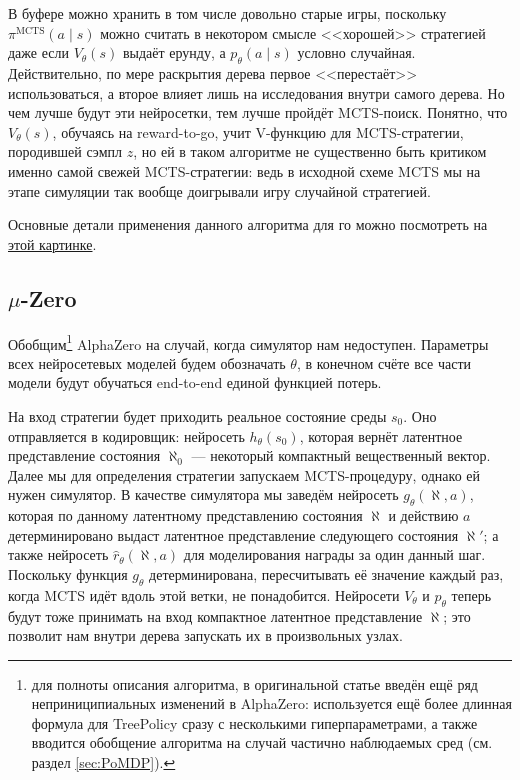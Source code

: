 В буфере можно хранить в том числе довольно старые игры, поскольку $\pi^{\mathrm{MCTS}}(a \mid s)$ можно считать в некотором смысле <<хорошей>> стратегией даже если $V_\theta(s)$ выдаёт ерунду, а $p_{\theta}(a \mid s)$ условно случайная. Действительно, по мере раскрытия дерева первое <<перестаёт>> использоваться, а второе влияет лишь на исследования внутри самого дерева. Но чем лучше будут эти нейросетки, тем лучше пройдёт MCTS-поиск. Понятно, что $V_{\theta}(s)$, обучаясь на reward-to-go, учит V-функцию для MCTS-стратегии, породившей сэмпл $z$, но ей в таком алгоритме не существенно быть критиком именно самой свежей MCTS-стратегии: ведь в исходной схеме MCTS мы на этапе симуляции так вообще доигрывали игру случайной стратегией.

\begin{example}
Основные детали применения данного алгоритма для го можно посмотреть на \href{https://miro.medium.com/max/2000/1*0pn33bETjYOimWjlqDLLNw.png}{этой картинке}.
\end{example}

\subsection{$\mu$-Zero}

Обобщим\footnote{для полноты описания алгоритма, в оригинальной статье введён ещё ряд неприниципиальных изменений в AlphaZero: используется ещё более длинная формула для TreePolicy сразу с несколькими гиперпараметрами, а также вводится обобщение алгоритма на случай частично наблюдаемых сред (см. раздел \ref{sec:PoMDP}).} AlphaZero на случай, когда симулятор нам недоступен. Параметры всех нейросетевых моделей будем обозначать $\theta$, в конечном счёте все части модели будут обучаться end-to-end единой функцией потерь.

На вход стратегии будет приходить реальное состояние среды $s_0$. Оно отправляется в кодировщик: нейросеть $h_{\theta}(s_0)$, которая вернёт латентное представление состояния $\aleph_0$ --- некоторый компактный вещественный вектор. Далее мы для определения стратегии запускаем MCTS-процедуру, однако ей нужен симулятор. В качестве симулятора мы заведём нейросеть $g_{\theta}(\aleph, a)$, которая по данному латентному представлению состояния $\aleph$ и действию $a$ детерминировано выдаст латентное представление следующего состояния $\aleph'$; а также нейросеть $\hat{r}_{\theta}(\aleph, a)$ для моделирования награды за один данный шаг. Поскольку функция $g_{\theta}$ детерминирована, пересчитывать её значение каждый раз, когда MCTS идёт вдоль этой ветки, не понадобится. Нейросети $V_{\theta}$ и $p_{\theta}$ теперь будут тоже принимать на вход компактное латентное представление $\aleph$; это позволит нам внутри дерева запускать их в произвольных узлах.


